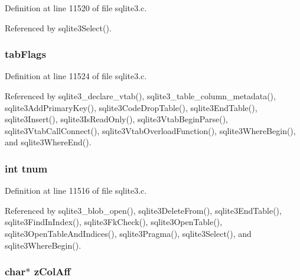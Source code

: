 Definition at line 11520 of file sqlite3.\+c.



Referenced by sqlite3\+Select().

\hypertarget{struct_table_a3db3f3d875fa7b0edd741ba992840e27}{}
\subsubsection[{tab\+Flags}]{ tab\+Flags}\label{struct_table_a3db3f3d875fa7b0edd741ba992840e27}


Definition at line 11524 of file sqlite3.\+c.



Referenced by sqlite3\+\_\+declare\+\_\+vtab(), sqlite3\+\_\+table\+\_\+column\+\_\+metadata(), sqlite3\+Add\+Primary\+Key(), sqlite3\+Code\+Drop\+Table(), sqlite3\+End\+Table(), sqlite3\+Insert(), sqlite3\+Is\+Read\+Only(), sqlite3\+Vtab\+Begin\+Parse(), sqlite3\+Vtab\+Call\+Connect(), sqlite3\+Vtab\+Overload\+Function(), sqlite3\+Where\+Begin(), and sqlite3\+Where\+End().

\hypertarget{struct_table_a2943a2c9e4915d379274c39cbb0147d9}{}
\subsubsection[{tnum}]{\setlength{\rightskip}{0pt plus 5cm}int tnum}\label{struct_table_a2943a2c9e4915d379274c39cbb0147d9}


Definition at line 11516 of file sqlite3.\+c.



Referenced by sqlite3\+\_\+blob\+\_\+open(), sqlite3\+Delete\+From(), sqlite3\+End\+Table(), sqlite3\+Find\+In\+Index(), sqlite3\+Fk\+Check(), sqlite3\+Open\+Table(), sqlite3\+Open\+Table\+And\+Indices(), sqlite3\+Pragma(), sqlite3\+Select(), and sqlite3\+Where\+Begin().

\hypertarget{struct_table_a829718486911afcd2a61c54f28491d76}{}
\subsubsection[{z\+Col\+Aff}]{\setlength{\rightskip}{0pt plus 5cm}char$\ast$ z\+Col\+Aff}\label{struct_table_a829718486911afcd2a61c54f28491d76}



